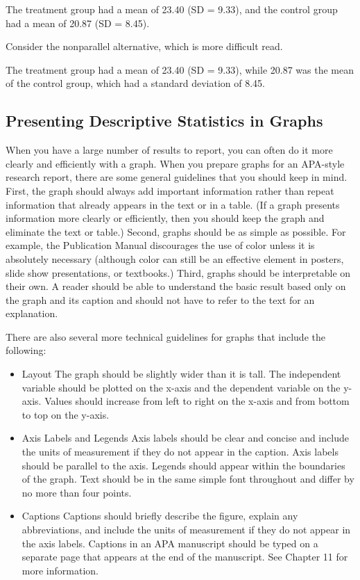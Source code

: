 \begin{kframe}
The treatment group had a mean of 23.40 (SD = 9.33), and the control group had a mean of 20.87 (SD = 8.45).
\end{kframe}

Consider the nonparallel alternative, which is more difficult read.

\begin{kframe}
The treatment group had a mean of 23.40 (SD = 9.33), while 20.87 was the mean of the control group, which had a standard deviation of 8.45.
\end{kframe}

\subsection{Presenting Descriptive Statistics in Graphs}

When you have a large number of results to report, you can often do it more clearly and efficiently with a graph. When you prepare graphs for an APA-style research report, there are some general guidelines that you should keep in mind. First, the graph should always add important information rather than repeat information that already appears in the text or in a table. (If a graph presents information more clearly or efficiently, then you should keep the graph and eliminate the text or table.) Second, graphs should be as simple as possible. For example, the Publication Manual discourages the use of color unless it is absolutely necessary (although color can still be an effective element in posters, slide show presentations, or textbooks.) Third, graphs should be interpretable on their own. A reader should be able to understand the basic result based only on the graph and its caption and should not have to refer to the text for an explanation.


There are also several more technical guidelines for graphs that include the following:


\begin{itemize}
\item Layout
The graph should be slightly wider than it is tall.
The independent variable should be plotted on the x-axis and the dependent variable on
the y-axis.
Values should increase from left to right on the x-axis and from bottom to top on the y-axis.

\item Axis Labels and Legends
Axis labels should be clear and concise and include the units of measurement if they do not appear in the caption.
Axis labels should be parallel to the axis.
Legends should appear within the boundaries of the graph.
Text should be in the same simple font throughout and differ by no more than four points.

\item Captions
Captions should briefly describe the figure, explain any abbreviations, and include the units of measurement if they do not appear in the axis labels.
Captions in an APA manuscript should be typed on a separate page that appears at the end of the manuscript. See Chapter 11 for more information.
\end{itemize}


